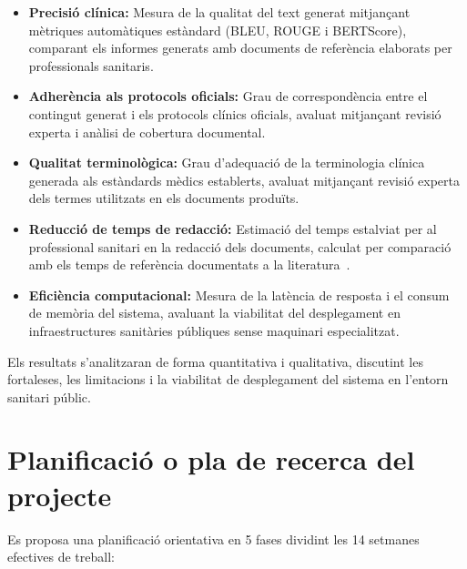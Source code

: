 \documentclass[CAT]{TFUOC}%
\begin{document}
\begin{itemize}
    \item \textbf{Precisió clínica:} Mesura de la qualitat del text generat mitjançant mètriques automàtiques estàndard (BLEU, ROUGE i BERTScore), comparant els informes generats amb documents de referència elaborats per professionals sanitaris.

    \item \textbf{Adherència als protocols oficials:} Grau de correspondència entre el contingut generat i els protocols clínics oficials, avaluat mitjançant revisió experta i anàlisi de cobertura documental.

    \item \textbf{Qualitat terminològica:} Grau d'adequació de la terminologia clínica generada als estàndards mèdics establerts, avaluat mitjançant revisió experta dels termes utilitzats en els documents produïts.

    \item \textbf{Reducció de temps de redacció:} Estimació del temps estalviat per al professional sanitari en la redacció dels documents, calculat per comparació amb els temps de referència documentats a la literatura~\cite{sinsky2016allocation}.
    
    \item \textbf{Eficiència computacional:} Mesura de la latència de resposta i el consum de memòria del sistema, avaluant la viabilitat del desplegament en infraestructures sanitàries públiques sense maquinari especialitzat.
\end{itemize}

Els resultats s'analitzaran de forma quantitativa i qualitativa, discutint les fortaleses, les limitacions i la viabilitat de desplegament del sistema en l'entorn sanitari públic.   



\section{Planificació o pla de recerca del projecte}

Es proposa una planificació orientativa en 5 fases dividint les 14 setmanes efectives de treball:
\end{document}
